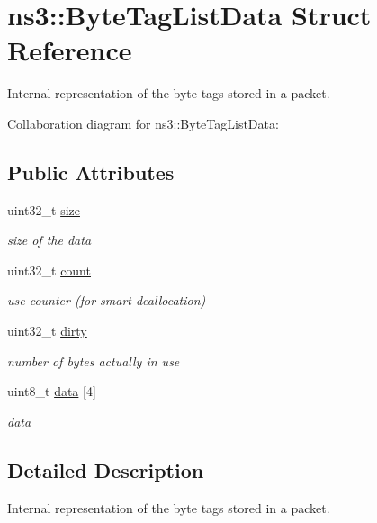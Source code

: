 \hypertarget{structns3_1_1ByteTagListData}{}\section{ns3\+:\+:Byte\+Tag\+List\+Data Struct Reference}
\label{structns3_1_1ByteTagListData}


Internal representation of the byte tags stored in a packet.  




Collaboration diagram for ns3\+:\+:Byte\+Tag\+List\+Data\+:
\subsection*{Public Attributes}
\begin{DoxyCompactItemize}
\item 
uint32\+\_\+t \hyperlink{structns3_1_1ByteTagListData_a47780cb505d6617e2bc9d27616deec99}{size}
\begin{DoxyCompactList}\small\item\em size of the data \end{DoxyCompactList}\item 
uint32\+\_\+t \hyperlink{structns3_1_1ByteTagListData_ad988d414af9ffa6c08db7deec4111a5d}{count}
\begin{DoxyCompactList}\small\item\em use counter (for smart deallocation) \end{DoxyCompactList}\item 
uint32\+\_\+t \hyperlink{structns3_1_1ByteTagListData_a1fa089d3d62fdd4c653ab17e57a9eb42}{dirty}
\begin{DoxyCompactList}\small\item\em number of bytes actually in use \end{DoxyCompactList}\item 
uint8\+\_\+t \hyperlink{structns3_1_1ByteTagListData_ada0659d129ba8de66119d4445909729c}{data} \mbox{[}4\mbox{]}
\begin{DoxyCompactList}\small\item\em data \end{DoxyCompactList}\end{DoxyCompactItemize}


\subsection{Detailed Description}
Internal representation of the byte tags stored in a packet. 

